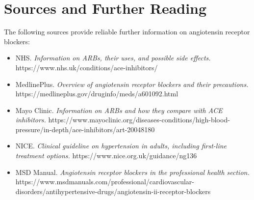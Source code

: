 \section*{Sources and Further Reading}
The following sources provide reliable further information on angiotensin receptor blockers:

\begin{itemize}
    \item NHS. \textit{Information on ARBs, their uses, and possible side effects.} https://www.nhs.uk/conditions/ace-inhibitors/
    \item MedlinePlus. \textit{Overview of angiotensin receptor blockers and their precautions.} https://medlineplus.gov/druginfo/meds/a601092.html
    \item Mayo Clinic. \textit{Information on ARBs and how they compare with ACE inhibitors.} https://www.mayoclinic.org/diseases-conditions/high-blood-pressure/in-depth/ace-inhibitors/art-20048180
    \item NICE. \textit{Clinical guideline on hypertension in adults, including first-line treatment options.} https://www.nice.org.uk/guidance/ng136
    \item MSD Manual. \textit{Angiotensin receptor blockers in the professional health section.} https://www.msdmanuals.com/professional/cardiovascular-disorders/antihypertensive-drugs/angiotensin-ii-receptor-blockers
\end{itemize}
